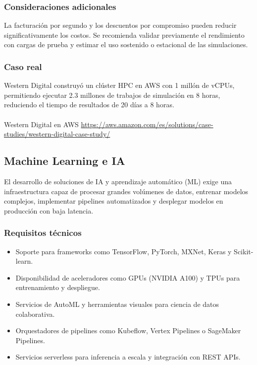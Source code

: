 {            \subsubsection{Consideraciones adicionales}
                La facturación por segundo y los descuentos por compromiso pueden reducir significativamente los costos. Se recomienda validar previamente el rendimiento con cargas de prueba y estimar el uso sostenido o estacional de las simulaciones.

                \subsubsection{Caso real}
                Western Digital construyó un clúster HPC en AWS con 1 millón de vCPUs, permitiendo ejecutar 2.3 millones de trabajos de simulación en 8 horas, reduciendo el tiempo de resultados de 20 días a 8 horas.

                \paragraph{}Western Digital en AWS \href{https://aws.amazon.com/es/solutions/case-studies/western-digital-case-study/}{https://aws.amazon.com/es/solutions/case-studies/western-digital-case-study/}
            
        \subsection{Machine Learning e IA}
            El desarrollo de soluciones de IA y aprendizaje automático (ML) exige una infraestructura capaz de procesar grandes volúmenes de datos, entrenar modelos complejos, implementar pipelines automatizados y desplegar modelos en producción con baja latencia.
            
            \subsubsection{Requisitos técnicos}
                \begin{itemize}
                    \item Soporte para frameworks como TensorFlow, PyTorch, MXNet, Keras y Scikit-learn.
                    \item Disponibilidad de aceleradores como GPUs (NVIDIA A100) y TPUs para entrenamiento y despliegue.
                    \item Servicios de AutoML y herramientas visuales para ciencia de datos colaborativa.
                    \item Orquestadores de pipelines como Kubeflow, Vertex Pipelines o SageMaker Pipelines.
                    \item Servicios serverless para inferencia a escala y integración con REST APIs.
                \end{itemize}
                
}
